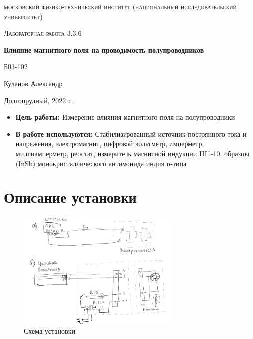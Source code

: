 \documentclass[a4paper, 12pt]{article}
\begin{document}
\begin{titlepage}
	\centering
	\vspace{5cm}
	{\scshape\LARGE московский физико-технический институт (национальный исследовательский университет) \par}
	\vspace{6cm}
	{\scshape\Large Лабораторная работа 3.3.6 \par}
	{\huge\bfseries Влияние магнитного поля на проводимость полупроводников \par}
	\vspace{1cm}
	\vfill
\begin{flushright}
	{\large Б03-102}\par
	\vspace{0.3cm}
	{\LARGE Куланов Александр}
\end{flushright}
	

	\vfill


	Долгопрудный, 2022 г.
\end{titlepage}

\begin{itemize}
	\item \textbf{Цель работы:} Измерение влияния магнитного поля на полупроводники
    \item \textbf{В работе используются:} Стабилизированный источник постоянного тока и напряжения, электромагнит, цифровой вольтметр, aмперметр, миллиамперметр, реостат, измеритель магнитной индукции III1-10, образцы (InSb) монокристаллического антимонида индия n-типа
    
\end{itemize}

\section{Описание установки}
\begin{figure}[H]
    \centering
    \includegraphics[width=0.7\textwidth]{set}
    \caption{Схема установки}
    \label{fig:set}
\end{figure}
\end{document}
